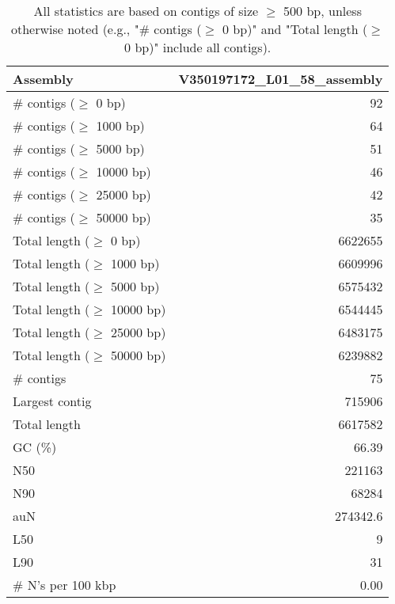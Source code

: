 \documentclass[12pt,a4paper]{article}
\begin{document}
\begin{table}[ht]
\begin{center}
\caption{All statistics are based on contigs of size $\geq$ 500 bp, unless otherwise noted (e.g., "\# contigs ($\geq$ 0 bp)" and "Total length ($\geq$ 0 bp)" include all contigs).}
\begin{tabular}{|l*{1}{|r}|}
\hline
Assembly & V350197172\_L01\_58\_assembly \\ \hline
\# contigs ($\geq$ 0 bp) & 92 \\ \hline
\# contigs ($\geq$ 1000 bp) & 64 \\ \hline
\# contigs ($\geq$ 5000 bp) & 51 \\ \hline
\# contigs ($\geq$ 10000 bp) & 46 \\ \hline
\# contigs ($\geq$ 25000 bp) & 42 \\ \hline
\# contigs ($\geq$ 50000 bp) & 35 \\ \hline
Total length ($\geq$ 0 bp) & 6622655 \\ \hline
Total length ($\geq$ 1000 bp) & 6609996 \\ \hline
Total length ($\geq$ 5000 bp) & 6575432 \\ \hline
Total length ($\geq$ 10000 bp) & 6544445 \\ \hline
Total length ($\geq$ 25000 bp) & 6483175 \\ \hline
Total length ($\geq$ 50000 bp) & 6239882 \\ \hline
\# contigs & 75 \\ \hline
Largest contig & 715906 \\ \hline
Total length & 6617582 \\ \hline
GC (\%) & 66.39 \\ \hline
N50 & 221163 \\ \hline
N90 & 68284 \\ \hline
auN & 274342.6 \\ \hline
L50 & 9 \\ \hline
L90 & 31 \\ \hline
\# N's per 100 kbp & 0.00 \\ \hline
\end{tabular}
\end{center}
\end{table}
\end{document}

